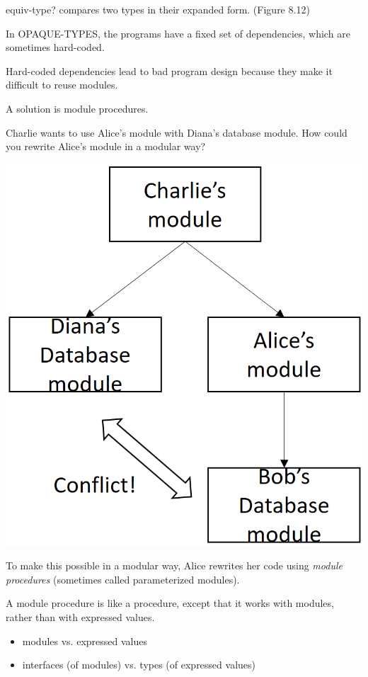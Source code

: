 \documentclass{article}
\begin{document}
\begin{huge}
equiv-type? compares two types in their expanded form. (Figure 8.12)


In OPAQUE-TYPES, the programs have a fixed set of dependencies, 
which are sometimes hard-coded. 

Hard-coded dependencies lead to bad program design because they make it
difficult to reuse modules.

A solution is module procedures.




Charlie wants to use Alice's module with Diana's database module.
How could you rewrite Alice's module in a modular way?

\begin{center}
\includegraphics[width=0.5\linewidth]{eopl3_ch8_module_conflicts}
\end{center}



To make this possible in a modular way, Alice rewrites her code using
{\it module procedures} (sometimes called parameterized modules). 

A module procedure is like a procedure, except that it works with modules,
rather than with expressed values.
\begin{itemize}
\item modules vs. expressed values
\item interfaces (of modules) vs. types (of expressed values)
\end{itemize}


\end{huge}
\end{document}
